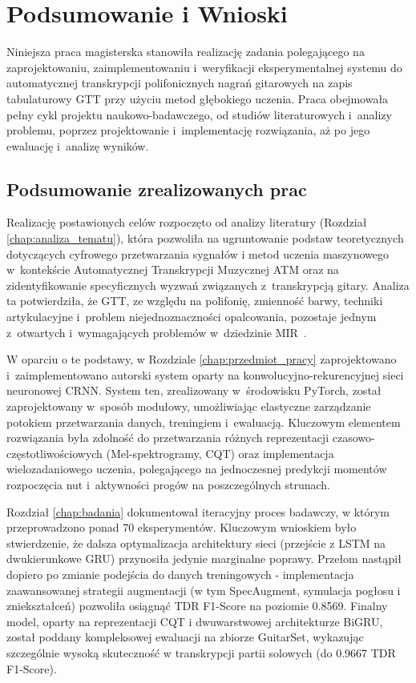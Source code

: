 \chapter{Podsumowanie i Wnioski}
\label{chap:podsumowanie}

Niniejsza praca magisterska stanowiła realizację zadania polegającego na zaprojektowaniu, zaimplementowaniu i~weryfikacji eksperymentalnej systemu do automatycznej transkrypcji polifonicznych nagrań gitarowych na zapis tabulaturowy GTT przy użyciu metod głębokiego uczenia. Praca obejmowała pełny cykl projektu naukowo-badawczego, od studiów literaturowych i~analizy problemu, poprzez projektowanie i~implementację rozwiązania, aż po jego ewaluację i~analizę wyników.

\section{Podsumowanie zrealizowanych prac}
\label{sec:streszczenie_prac}

Realizację postawionych celów rozpoczęto od analizy literatury (Rozdział \ref{chap:analiza_tematu}), która pozwoliła na ugruntowanie podstaw teoretycznych dotyczących cyfrowego przetwarzania sygnałów i metod uczenia maszynowego w~kontekście Automatycznej Transkrypcji Muzycznej ATM oraz na zidentyfikowanie specyficznych wyzwań związanych z~transkrypcją gitary. Analiza ta potwierdziła, że GTT, ze względu na polifonię, zmienność barwy, techniki artykulacyjne i~problem niejednoznaczności opalcowania, pozostaje jednym z~otwartych i~wymagających problemów w~dziedzinie MIR~\autocite{Benetos2019AutomaticMusicTranscription, Wiggins2019TabCNN}.

W oparciu o te podstawy, w Rozdziale \ref{chap:przedmiot_pracy} zaprojektowano i~zaimplementowano autorski system oparty na konwolucyjno-rekurencyjnej sieci neuronowej CRNN. System ten, zrealizowany w~środowisku PyTorch, został zaprojektowany w~sposób modułowy, umożliwiając elastyczne zarządzanie potokiem przetwarzania danych, treningiem i~ewaluacją. Kluczowym elementem rozwiązania była zdolność do przetwarzania różnych reprezentacji czasowo-częstotliwościowych (Mel-spektrogramy, CQT) oraz implementacja wielozadaniowego uczenia, polegającego na jednoczesnej predykcji momentów rozpoczęcia nut i~aktywności progów na poszczególnych strunach.

Rozdział \ref{chap:badania} dokumentował iteracyjny proces badawczy, w którym przeprowadzono ponad 70 eksperymentów. Kluczowym wnioskiem było stwierdzenie, że dalsza optymalizacja architektury sieci (przejście z LSTM na dwukierunkowe GRU) przynosiła jedynie marginalne poprawy. Przełom nastąpił dopiero po zmianie podejścia do danych treningowych - implementacja zaawansowanej strategii augmentacji (w tym SpecAugment, symulacja pogłosu i zniekształceń) pozwoliła osiągnąć TDR F1-Score na poziomie 0.8569. Finalny model, oparty na reprezentacji CQT i dwuwarstwowej architekturze BiGRU, został poddany kompleksowej ewaluacji na zbiorze GuitarSet, wykazując szczególnie wysoką skuteczność w transkrypcji partii solowych (do 0.9667 TDR F1-Score).


